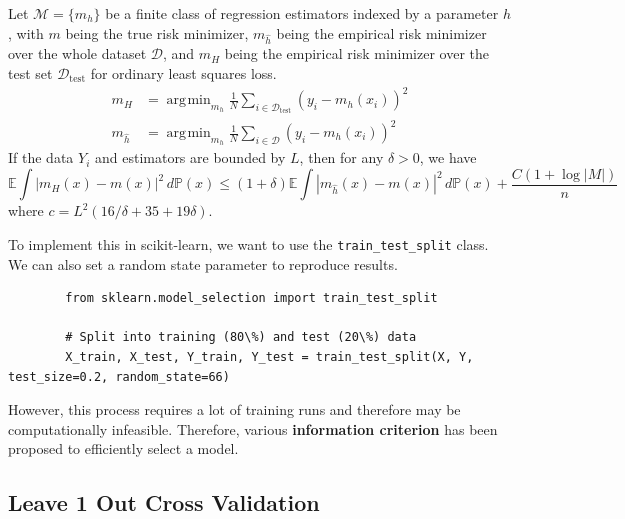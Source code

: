 \documentclass{article}
\DeclareMathOperator*{\argmin}{\arg\!\min}
\begin{document}
    \begin{theorem}
      Let $\mathcal{M} = \{m_h\}$ be a finite class of regression estimators indexed by a parameter $h$, with $m$ being the true risk minimizer, $m_{\hat{h}}$ being the empirical risk minimizer over the whole dataset $\mathcal{D}$, and $m_{H}$ being the empirical risk minimizer over the test set $\mathcal{D}_{\mathrm{test}}$ for ordinary least squares loss. 
      \begin{align}
        m_H & = \argmin_{m_h} \frac{1}{N} \sum_{i \in \mathcal{D}_{\mathrm{test}}} (y_i - m_h(x_i))^2 \\ 
        m_{\hat{h}} & = \argmin_{m_h} \frac{1}{N} \sum_{i \in \mathcal{D}} (y_i - m_h(x_i))^2 
      \end{align}
      If the data $Y_i$ and estimators are bounded by $L$, then for any $\delta > 0$, we have 
      \begin{equation}
        \mathbb{E} \int |m_H (x) - m(x)|^2 \,d\mathbb{P}(x) \leq (1 + \delta) \mathbb{E} \int |m_{\hat{h}} (x) - m(x) |^2 \,d \mathbb{P}(x) + \frac{C (1 + \log{|M|})}{n}
      \end{equation}
      where $c = L^2 (16/\delta + 35 + 19\delta)$. 
    \end{theorem}

    \begin{code}
      To implement this in scikit-learn, we want to use the \texttt{train\_test\_split} class. We can also set a random state parameter to reproduce results. 
      \begin{lstlisting}
        from sklearn.model_selection import train_test_split 

        # Split into training (80\%) and test (20\%) data 
        X_train, X_test, Y_train, Y_test = train_test_split(X, Y, test_size=0.2, random_state=66)
      \end{lstlisting}
    \end{code}

    However, this process requires a lot of training runs and therefore may be computationally infeasible. Therefore, various \textbf{information criterion} has been proposed to efficiently select a model. 

  \subsection{Leave 1 Out Cross Validation} 
\end{document}
